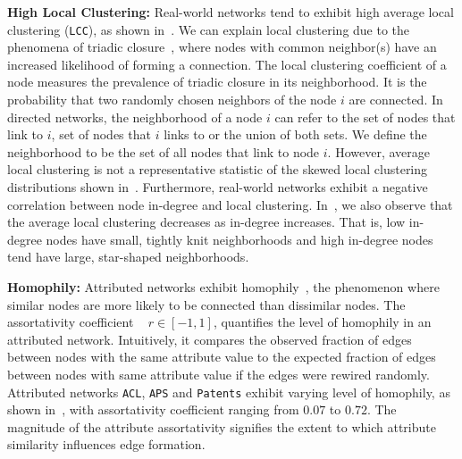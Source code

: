 \textbf{High Local Clustering:}
Real-world networks tend to exhibit high average local clustering
(\texttt{LCC}), as shown in~. We can explain local
clustering due to the phenomena of triadic closure~\cite{simmel1950sociology,
newman2001clustering}, where nodes with common neighbor(s) have an increased
likelihood of forming a connection.
The local clustering coefficient of a node measures the prevalence of triadic
closure in its neighborhood. It is the probability that two randomly chosen
neighbors of the node $i$ are connected. In directed networks, the neighborhood
of a node $i$ can refer to the set of nodes that link to $i$, set of nodes that
$i$ links to or the union of both sets. We define the neighborhood to be the set
of all nodes that link to node $i$.  However, average local clustering is not a
representative statistic of the {skewed} local clustering distributions shown
in~. Furthermore, real-world networks exhibit a negative
correlation between node in-degree  and local clustering. In~,
we also observe that the average local clustering  decreases as in-degree
increases. That is, low in-degree nodes have small, tightly knit neighborhoods
and high in-degree nodes tend have large, star-shaped neighborhoods.


\textbf{Homophily:}
Attributed networks exhibit homophily~\cite{mcpherson2001birds}, the phenomenon where similar nodes are more likely
to be connected than dissimilar nodes. The assortativity coefficient
~\cite{newman2002assortative} $r \in [-1, 1]$,
quantifies the level of homophily in an attributed network. Intuitively, it
compares the observed fraction of edges between nodes with the same attribute
value to the expected fraction of edges between nodes with same attribute value
if the edges were rewired randomly.
Attributed networks \texttt{ACL}, \texttt{APS} and \texttt{Patents} exhibit
varying level of homophily, as shown in~, with assortativity
coefficient ranging from $0.07$ to $0.72$.
The magnitude of the attribute assortativity
signifies the extent to which attribute similarity influences edge formation.

